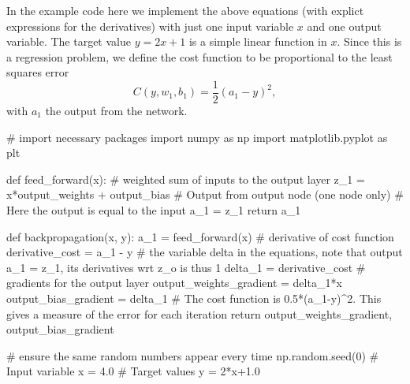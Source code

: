 \documentclass[%
oneside,                 %
final,                   %
10pt]{article}
\begin{document}
In the example code here we implement the above equations (with explict
expressions for the derivatives) with just one input variable $x$ and
one output variable.  The target value $y=2x+1$ is a simple linear
function in $x$. Since this is a regression problem, we define the cost function to be proportional to the least squares error
\[
C(y,w_1,b_1)=\frac{1}{2}(a_1-y)^2,
\]
with $a_1$ the output from the network.





















































\bpycod
# import necessary packages
import numpy as np
import matplotlib.pyplot as plt

def feed_forward(x):
    # weighted sum of inputs to the output layer
    z_1 = x*output_weights + output_bias
    # Output from output node (one node only)
    # Here the output is equal to the input
    a_1 = z_1
    return a_1

def backpropagation(x, y):
    a_1 = feed_forward(x)
    # derivative of cost function
    derivative_cost = a_1 - y
    # the variable delta in the equations, note that output a_1 = z_1, its derivatives wrt z_o is thus 1
    delta_1 = derivative_cost
    # gradients for the output layer
    output_weights_gradient = delta_1*x
    output_bias_gradient = delta_1
    # The cost function is 0.5*(a_1-y)^2. This gives a measure of the error for each iteration
    return output_weights_gradient, output_bias_gradient

# ensure the same random numbers appear every time
np.random.seed(0)
# Input variable
x = 4.0
# Target values
y = 2*x+1.0
\end{document}
